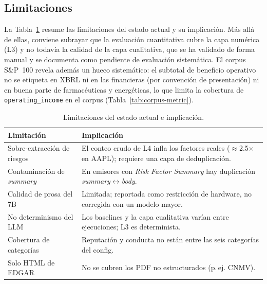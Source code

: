 \documentclass[conference]{IEEEtran}
\begin{document}
\subsection{Limitaciones}
La Tabla~\ref{tab:limits} resume las limitaciones del estado actual y su
implicación. Más allá de ellas, conviene subrayar que la evaluación cuantitativa
cubre la capa numérica (L3) y no todavía la calidad de la capa cualitativa, que
se ha validado de forma manual y se documenta como pendiente de evaluación
sistemática.
El corpus S\&P~100 revela además un hueco sistemático: el subtotal de beneficio
operativo no se etiqueta en XBRL ni en las financieras (por convención de
presentación) ni en buena parte de farmacéuticas y energéticas, lo que limita la
cobertura de \texttt{operating\_income} en el corpus
(Tabla~\ref{tab:corpus-metric}).

\begin{table}[t]
\centering
\caption{Limitaciones del estado actual e implicación.}
\label{tab:limits}
\begin{tabular}{p{}p{}}
\toprule
Limitación & Implicación \\
\midrule
Sobre-extracción de riesgos & El conteo crudo de L4 infla los factores reales
($\approx$2.5$\times$ en AAPL); requiere una capa de deduplicación. \\
Contaminación de \textit{summary} & En emisores con \textit{Risk Factor Summary}
hay duplicación \textit{summary}$\leftrightarrow$\textit{body}. \\
Calidad de prosa del 7B & Limitada; reportada como restricción de hardware, no
corregida con un modelo mayor. \\
No determinismo del LLM & Los baselines y la capa cualitativa varían entre
ejecuciones; L3 es determinista. \\
Cobertura de categorías & Reputación y conducta no están entre las seis
categorías del config. \\
Solo HTML de EDGAR & No se cubren los PDF no estructurados (p.\,ej. CNMV). \\
\bottomrule
\end{tabular}
\end{table}
\end{document}
